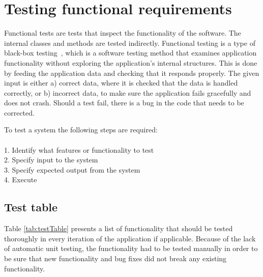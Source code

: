 \newpage
\section{Testing functional requirements}
\label{sec:funcTest}
Functional tests are tests that inspect the functionality of the software. The internal classes and methods are tested indirectly. Functional testing is a type of black-box testing~\cite{blackbox}, which is a software testing method that examines application functionality without exploring the application's internal structures. This is done by feeding the application data and checking that it responds properly. The given input is either a) correct data, where it is checked that the data is handled correctly, or b) incorrect data, to make sure the application fails gracefully and does not crash. Should a test fail, there is a bug in the code that needs to be corrected.

To test a system the following steps are required:\\\\
1. Identify what features or functionality to test\\
2. Specify input to the system\\
3. Specify expected output from the system\\
4. Execute

\subsection{Test table}
Table \ref{tab:testTable} presents a list of functionality that should be tested thoroughly in every iteration of the application if applicable. Because of the lack of automatic unit testing, the functionality had to be tested manually in order to be sure that new functionality and bug fixes did not break any existing functionality.

